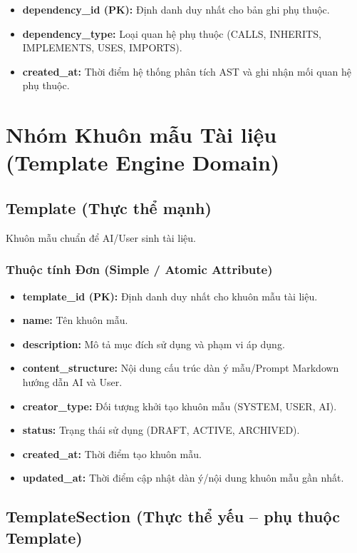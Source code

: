 \begin{itemize}
    \item \textbf{dependency\_id (PK):} Định danh duy nhất cho bản ghi phụ thuộc.
    \item \textbf{dependency\_type:} Loại quan hệ phụ thuộc (CALLS, INHERITS, IMPLEMENTS, USES, IMPORTS).
    \item \textbf{created\_at:} Thời điểm hệ thống phân tích AST và ghi nhận mối quan hệ phụ thuộc.
\end{itemize}


\section{Nhóm Khuôn mẫu Tài liệu (Template Engine Domain)}

\subsection{Template (Thực thể mạnh)}

Khuôn mẫu chuẩn để AI/User sinh tài liệu.

\subsubsection{Thuộc tính Đơn (Simple / Atomic Attribute)}

\begin{itemize}
    \item \textbf{template\_id (PK):} Định danh duy nhất cho khuôn mẫu tài liệu.
    \item \textbf{name:} Tên khuôn mẫu.
    \item \textbf{description:} Mô tả mục đích sử dụng và phạm vi áp dụng.
    \item \textbf{content\_structure:} Nội dung cấu trúc dàn ý mẫu/Prompt Markdown hướng dẫn AI và User.
    \item \textbf{creator\_type:} Đối tượng khởi tạo khuôn mẫu (SYSTEM, USER, AI).
    \item \textbf{status:} Trạng thái sử dụng (DRAFT, ACTIVE, ARCHIVED).
    \item \textbf{created\_at:} Thời điểm tạo khuôn mẫu.
    \item \textbf{updated\_at:} Thời điểm cập nhật dàn ý/nội dung khuôn mẫu gần nhất.
\end{itemize}


\subsection{TemplateSection (Thực thể yếu -- phụ thuộc Template)}

